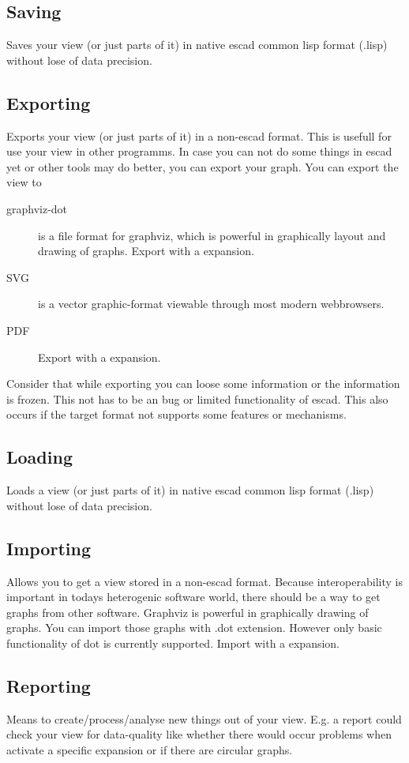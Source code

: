 \documentclass[a4paper, 12pt, openany]{scrbook}
\begin{document}
\subsection{Saving}
Saves your view (or just parts of it) in native escad common lisp format (.lisp) without lose of data precision.
\subsection{Exporting}
Exports your view (or just parts of it) in a non-escad format. This is usefull for use your view in other programms.
In case you can not do some things in escad yet or other tools may do better, you can export your graph. You can export the view to
\begin{description}
\item[graphviz-dot] is a file format for graphviz, which is powerful in graphically layout and drawing of graphs. Export with a expansion.
\item[SVG] is a vector graphic-format viewable through most modern webbrowsers.
\item[PDF] Export with a expansion.
\end{description}
Consider that while exporting you can loose some information or the information is frozen. This not has to be an bug or limited functionality of escad. This also occurs if the target format not supports some features or mechanisms.
\subsection{Loading}
Loads a view (or just parts of it) in native escad common lisp format (.lisp) without lose of data precision.
\subsection{Importing}
Allows you to get a view stored in a non-escad format.
Because interoperability is important in todays heterogenic software world, there should be a way to get graphs from other software.
Graphviz is powerful in graphically drawing of graphs. You can import those graphs with .dot extension. However only basic functionality of dot is currently supported. Import with a expansion.
\subsection{Reporting}
Means to create/process/analyse new things out of your view. E.g. a report could check your view for data-quality like whether there would occur problems when activate a specific expansion or if there are circular graphs.
\end{document}
